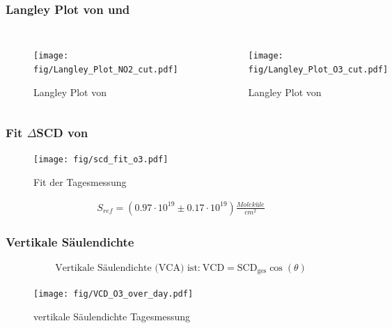 \documentclass{beamer}
\begin{document}
\begin{frame}
    \frametitle{Langley Plot von  und }
    \begin{columns}
    	\begin{figure}
    		\texttt{[image: fig/Langley\_Plot\_NO2\_cut.pdf]}
            \caption{Langley Plot von }   
	 	\end{figure}
 	    \begin{figure}
 	    	\texttt{[image: fig/Langley\_Plot\_O3\_cut.pdf]}
 	        \caption{Langley Plot von }
     	\end{figure} 
    \end{columns} 	
\end{frame}

\begin{frame}
    \frametitle{Fit $\Delta$SCD von }
    \vspace{-0.2cm}
    \begin{figure}
    	\texttt{[image: fig/scd\_fit\_o3.pdf]}
    	\caption{Fit der Tagesmessung }
    \end{figure}
	\vspace{-0.5cm}
	\begin{align}
		S_{ref}= (0.97 \cdot 10^{19}\pm 0.17 \cdot 10^{19}) \si{\frac{Moleküle}{cm^2}}
	\end{align}
\end{frame}

\begin{frame}
    \frametitle{Vertikale Säulendichte }
    \begin{align}
    	\text{Vertikale Säulendichte (VCA) ist:}\	\text{VCD} = \text{SCD}_\text{ges} \cos (\theta)
    \end{align}
    
    \vspace{-0.5cm}
    
    \begin{figure}
    	\texttt{[image: fig/VCD\_O3\_over\_day.pdf]}
		\caption{vertikale Säulendichte Tagesmessung }    
	\end{figure}
\end{frame}
\end{document}
